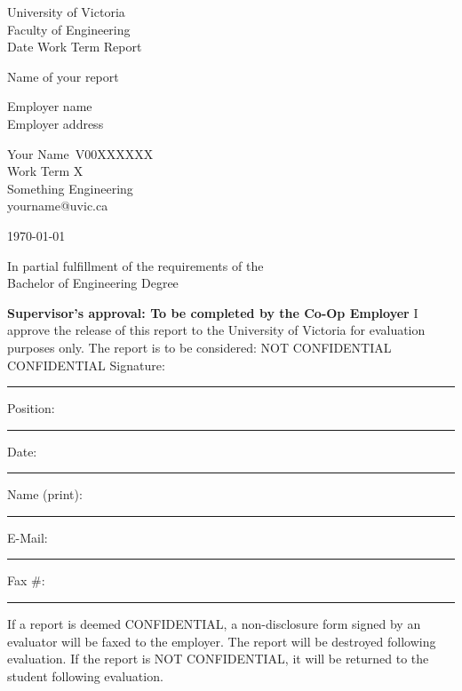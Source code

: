\documentclass[11pt]{article}
\providecommand{\blankline}{\rule{3cm}{0.5pt}}
\newenvironment{ApprovalBox}
	{ %
		\begin{framed}			
		\begin{scriptsize}
		\begin{flushleft}
		\begin{small}
	}
	{ %
		\end{small}
		\end{flushleft}
		\end{scriptsize}
		\end{framed}
	}
\begin{document}

\begin{center}
University of Victoria\\
Faculty of Engineering\\
Date Work Term Report\\
\vspace{1cm}

{\huge Name of your report}\\
\vspace{1cm}

Employer name \\
Employer address\\
\vspace{1cm}

Your Name\
V00XXXXXX\\
Work Term X\\
Something Engineering\\
yourname@uvic.ca\\
\vspace{0.5cm}

\today \\
\vspace{1cm}

In partial fulfillment of the requirements of the\\
Bachelor of Engineering Degree\\
\vfill



\begin{ApprovalBox}
	\textbf{Supervisor's approval: To be completed by the Co-Op Employer} 
	\newline\newline
	I approve the release of this report to the University of Victoria for evaluation purposes only. 
	\newline\newline
	The report is to be considered: \quad \Square{} NOT CONFIDENTIAL \quad \Square{} CONFIDENTIAL
	\newline\newline
	Signature: \blankline{} Position: \blankline{} Date: \blankline{} \newline\newline
	Name (print): \blankline{} E-Mail: \blankline{} Fax \#: \blankline{} 
	\newline\newline
	If a report is deemed CONFIDENTIAL, a non-disclosure form signed by an evaluator will be faxed to the employer. The report will be destroyed following evaluation. If the report is NOT CONFIDENTIAL, it will be returned to the student following evaluation.
\end{ApprovalBox}

\end{center}
\end{document}
